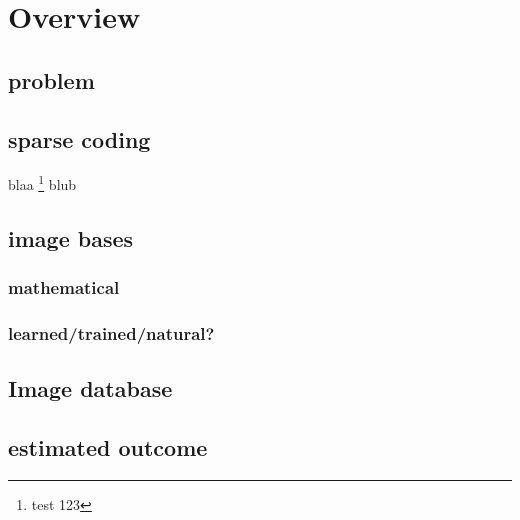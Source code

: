 \chapter{Overview}


\section{problem}


\section{sparse coding}
blaa \footnote{test 123} blub

\section{image bases}
\subsection{mathematical}
\subsection{learned/trained/natural?}


\section{Image database}


\section{estimated outcome}
